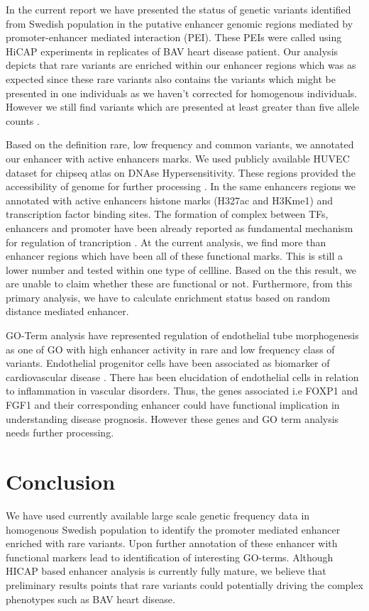 \documentclass[11pt]{article} %
\begin{document}
In the current report we have presented the status of genetic variants identified from Swedish population in the putative enhancer genomic regions mediated by promoter-enhancer mediated interaction (PEI). These PEIs were called using HiCAP experiments in replicates of BAV heart disease patient.  Our analysis depicts that rare variants are enriched within our enhancer regions which was as expected since these rare variants also contains the variants which might be presented in one individuals as we haven't corrected for homogenous individuals. However we still find variants which are presented at least greater than five allele counts . 

Based on the definition rare, low frequency and common variants, we annotated our enhancer with active enhancers marks. We used publicly available HUVEC dataset for chipseq atlas on DNAse Hypersensitivity. These regions provided the accessibility of genome for  further processing . In the same enhancers regions we annotated with active enhancers histone marks (H327ac and H3Kme1) and transcription factor binding sites. The formation of complex between TFs, enhancers and promoter have been already reported as fundamental mechanism for regulation of trancription \cite{mora2015loop}.  At the current analysis, we find more than enhancer regions which have been all of these functional marks. This is still a lower number and tested within one type of cellline. Based on the this result, we are unable to claim whether these are functional or not. Furthermore, from this primary analysis, we have to calculate enrichment status based on random distance mediated enhancer.

GO-Term analysis have represented regulation of endothelial tube morphogenesis as one of GO with high enhancer activity in rare and low frequency class of variants. Endothelial progenitor cells have been associated as biomarker of cardiovascular disease \cite{grisar2011endothelial}.  There has been elucidation of endothelial cells in relation to inflammation in vascular disorders. Thus, the genes associated i.e FOXP1 and FGF1 and their corresponding enhancer could have functional implication in understanding disease prognosis. However these genes and GO term analysis needs further processing.


\section{Conclusion}

We have used currently available large scale genetic frequency data in homogenous Swedish population to identify the promoter mediated enhancer enriched with rare variants. Upon further annotation of these enhancer with functional markers lead to identification of interesting GO-terms. Although HICAP based enhancer analysis is currently fully mature, we believe that preliminary results points that rare variants could potentially driving the complex phenotypes such as BAV heart disease.

\newpage




\end{document}
